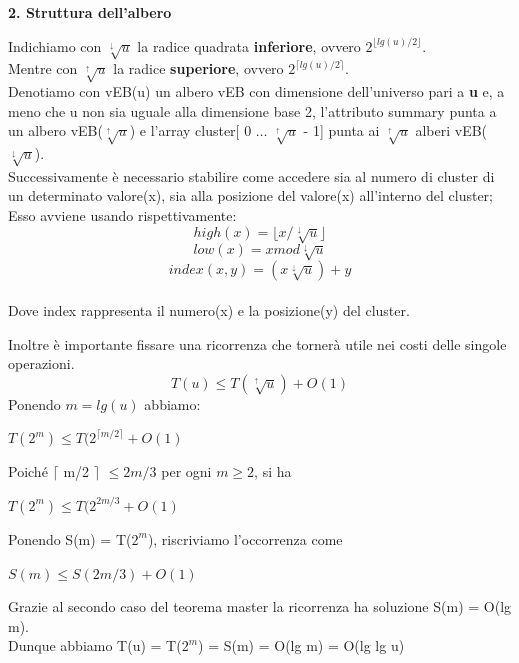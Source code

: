 \documentclass{article}
\begin{document}
\newpage
\begin{flushleft}
\huge \textbf{2. Struttura dell'albero}
\newline
\newline
\normalsize
    
    Indichiamo con $\sqrt[\downarrow]{u}$ la radice quadrata \textbf{inferiore}, ovvero $2^{\lfloor lg(u) / 2 \rfloor}$.\\
    Mentre con $\sqrt[\uparrow]{u}$ la radice \textbf{superiore}, ovvero $2^{\lceil lg(u) / 2 \rceil}$.\\
    Denotiamo con vEB(u) un albero vEB con dimensione dell'universo pari a \textbf{u} e, a meno che u non sia uguale alla dimensione base 2, l'attributo summary punta a un albero vEB($\sqrt[\uparrow]{u}$) e l'array cluster[ 0 $\dots$ $\sqrt[\uparrow]{u}$ - 1] punta ai $\sqrt[\uparrow]{u}$ alberi vEB($\sqrt[\downarrow]{u}$).\\
    Successivamente è necessario stabilire come accedere sia al numero di cluster di un determinato valore(x), sia alla posizione del valore(x) all'interno del cluster; Esso avviene usando rispettivamente:\\
    \begin{equation}
        high(x) = \lfloor x / \sqrt[\downarrow]{u} \rfloor
    \end{equation}
    \begin{equation}
        low(x) = x mod \sqrt[\downarrow]{u}
    \end{equation}
    \begin{equation}
        index(x, y) = (x\sqrt[\downarrow]{u}) + y
    \end{equation}
    \\
    Dove index rappresenta il numero(x) e la posizione(y) del cluster. 

    Inoltre è importante fissare una ricorrenza che tornerà  utile nei costi delle singole operazioni.
    \begin{equation}
        T(u) \leq T(\sqrt[\uparrow]{u}) + O(1)
    \end{equation}
    Ponendo $m = lg (u)$ abbiamo:
        \begin{center}
            $T(2^m) \leq T(2^{\lceil m/2 \rceil} +O(1)$
        \end{center}
    Poiché $\lceil$ m/2 $\rceil$ $\leq 2m/3$ per ogni $m \ge 2$, si ha
        \begin{center}
            $T(2^m) \leq T(2^{2m/3} + O(1)$
        \end{center}
    Ponendo S(m) = T($2^m$), riscriviamo l'occorrenza come
        \begin{center}
            $S(m) \leq S(2m/3) + O(1)$
        \end{center}
    Grazie al secondo caso del teorema master la ricorrenza ha soluzione S(m) = O(lg m).\\
    Dunque abbiamo T(u) = T($2^m$) = S(m) = O(lg m) = O(lg lg u)
\end{flushleft}
\end{document}

